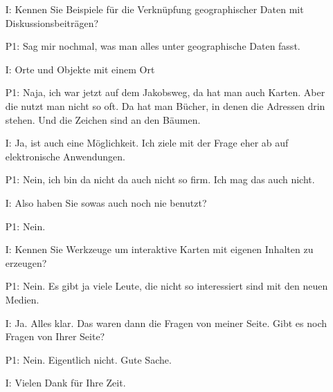 \begin{itemize}
    \item[I:] Kennen Sie Beispiele f{\"u}r die Verkn{\"u}pfung geographischer Daten mit Diskussionsbeitr{\"a}gen?
	\item[P1:] Sag mir nochmal, was man alles unter geographische Daten fasst.
	\item[I:] Orte und Objekte mit einem Ort
	\item[P1:] Naja, ich war jetzt auf dem Jakobsweg, da hat man auch Karten. Aber die nutzt man nicht so oft. Da hat man B{\"u}cher, in denen die Adressen drin stehen. Und die Zeichen sind an den B{\"a}umen.
	\item[I:] Ja, ist auch eine M{\"o}glichkeit. Ich ziele mit der Frage eher ab auf elektronische Anwendungen.
	\item[P1:] Nein, ich bin da nicht da auch nicht so firm. Ich mag das auch nicht.
	\item[I:] Also haben Sie sowas auch noch nie benutzt?
	\item[P1:] Nein.
	\item[I:] Kennen Sie Werkzeuge um interaktive Karten mit eigenen Inhalten zu erzeugen?
	\item[P1:] Nein. Es gibt ja viele Leute, die nicht so interessiert sind mit den neuen Medien. 
	\item[I:] Ja. Alles klar. Das waren dann die Fragen von meiner Seite. Gibt es noch Fragen von Ihrer Seite? 
    \item[P1:] Nein. Eigentlich nicht. Gute Sache.
    \item[I:] Vielen Dank f{\"u}r Ihre Zeit.
\end{itemize}